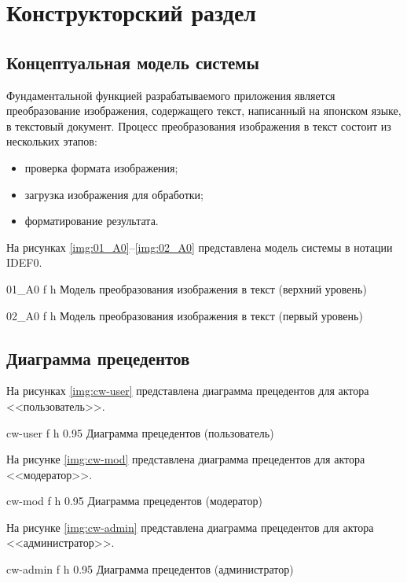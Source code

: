 \chapter{Конструкторский раздел}

\section{Концептуальная модель системы}

Фундаментальной функцией разрабатываемого приложения является преобразование изображения, содержащего текст, написанный на японском языке, в текстовый документ. Процесс преобразования изображения в текст состоит из нескольких этапов:
\begin{itemize}[label=---]
    \item проверка формата изображения;
    \item загрузка изображения для обработки;
    \item форматирование результата.
\end{itemize}
На рисунках \ref{img:01_A0}--\ref{img:02_A0} представлена модель системы в нотации IDEF0.

    {01_A0}
    {f}
    {h}
    {\linewidth}
    {Модель преобразования изображения в текст (верхний уровень)}

\clearpage

    {02_A0}
    {f}
    {h}
    {\linewidth}
    {Модель преобразования изображения в текст (первый уровень)}

\section{Диаграмма прецедентов}

На рисунках \ref{img:cw-user} представлена диаграмма прецедентов для актора <<пользователь>>.

    {cw-user}
    {f}
    {h}
    {0.95\linewidth}
    {Диаграмма прецедентов (пользователь)}

\clearpage

На рисунке \ref{img:cw-mod} представлена диаграмма прецедентов для актора <<модератор>>.

    {cw-mod}
    {f}
    {h}
    {0.95\linewidth}
    {Диаграмма прецедентов (модератор)}

На рисунке \ref{img:cw-admin} представлена диаграмма прецедентов для актора <<администратор>>.

    {cw-admin}
    {f}
    {h}
    {0.95\linewidth}
    {Диаграмма прецедентов (администратор)}

